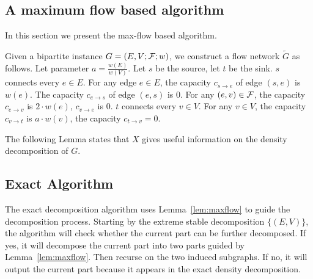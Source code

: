 {\subsection{A maximum flow based algorithm}


In this section we present the max-flow based algorithm. 

Given a bipartite instance $G = (E, V; \mathcal {F}; w)$, we construct a flow network $\widetilde{G}$ as follows. Let parameter $a = \frac{w(E)}{w(V)}$. Let $s$ be the source, let $t$ be the sink. $s$ connects every $e \in E$. For any edge $e \in E$, the capacity $c_{s\to e}$ of edge $(s, e)$ is $w(e)$. The capacity $c_{e \to s}$ of edge $(e, s)$ is $0$. For any $(e, v) \in \mathcal {F}$, the capacity $c_{e \to v}$ is $2 \cdot w(e)$, $c_{v \to e}$ is $0$. $t$ connects every $v \in V$. For any $v\in V$, the capacity $c_{v\to t}$ is $a \cdot w(v)$, the capacity $c_{t\to v} = 0$. 



 

The following Lemma states that $X$ gives useful information on the density decomposition of $G$. 




	\subsection{Exact Algorithm}

The exact decomposition algorithm uses Lemma~\ref{lem:maxflow} to guide the decomposition process. Starting by the extreme stable decomposition $\{(E, V)\}$, the algorithm will check whether the current part can be further decomposed. If yes, it will decompose the current part into two parts guided by Lemma~\ref{lem:maxflow}. Then recurse on the two induced subgraphs. 
If no, it will output the current part because it appears in the exact density decomposition. 


}
